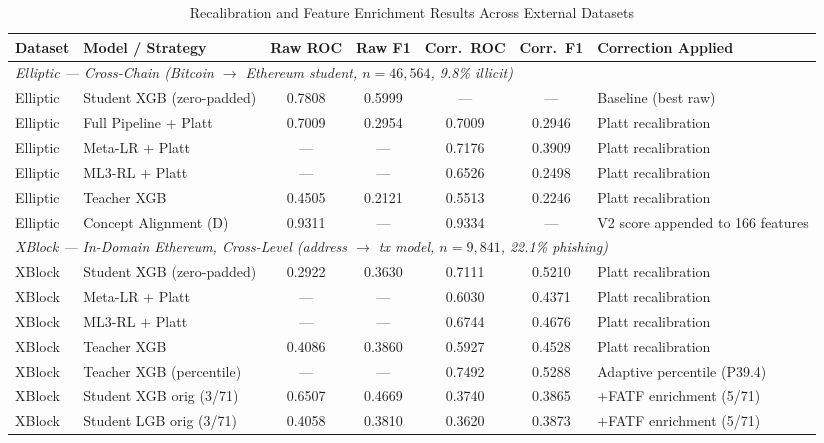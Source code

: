 \documentclass[journal]{IEEEtran}
\begin{document}
\begin{table}[!t]
\centering
\caption{Recalibration and Feature Enrichment Results Across External Datasets}
\label{tab:recalibration}
\scriptsize
\begin{tabular}{llccccl}
\toprule
\textbf{Dataset} & \textbf{Model / Strategy} & \textbf{Raw ROC} & \textbf{Raw F1} & \textbf{Corr.\ ROC} & \textbf{Corr.\ F1} & \textbf{Correction Applied} \\
\midrule
\multicolumn{7}{l}{\textit{Elliptic --- Cross-Chain (Bitcoin $\to$ Ethereum student, $n = 46{,}564$, 9.8\% illicit)}} \\
\cmidrule(l){1-7}
Elliptic & Student XGB (zero-padded) & 0.7808 & 0.5999 & --- & --- & Baseline (best raw) \\
Elliptic & Full Pipeline + Platt & 0.7009 & 0.2954 & 0.7009 & 0.2946 & Platt recalibration \\
Elliptic & Meta-LR + Platt & --- & --- & 0.7176 & 0.3909 & Platt recalibration \\
Elliptic & ML3-RL + Platt & --- & --- & 0.6526 & 0.2498 & Platt recalibration \\
Elliptic & Teacher XGB & 0.4505 & 0.2121 & 0.5513 & 0.2246 & Platt recalibration \\
Elliptic & Concept Alignment (D) & 0.9311 & --- & 0.9334 & --- & V2 score appended to 166 features \\
\midrule
\multicolumn{7}{l}{\textit{XBlock --- In-Domain Ethereum, Cross-Level (address $\to$ tx model, $n = 9{,}841$, 22.1\% phishing)}} \\
\cmidrule(l){1-7}
XBlock & Student XGB (zero-padded) & 0.2922 & 0.3630 & 0.7111 & 0.5210 & Platt recalibration \\
XBlock & Meta-LR + Platt & --- & --- & 0.6030 & 0.4371 & Platt recalibration \\
XBlock & ML3-RL + Platt & --- & --- & 0.6744 & 0.4676 & Platt recalibration \\
XBlock & Teacher XGB & 0.4086 & 0.3860 & 0.5927 & 0.4528 & Platt recalibration \\
XBlock & Teacher XGB (percentile) & --- & --- & 0.7492 & 0.5288 & Adaptive percentile (P39.4) \\
XBlock & Student XGB orig (3/71) & 0.6507 & 0.4669 & 0.3740 & 0.3865 & +FATF enrichment (5/71) \\
XBlock & Student LGB orig (3/71) & 0.4058 & 0.3810 & 0.3620 & 0.3873 & +FATF enrichment (5/71) \\

\end{tabular}
\end{table}
\end{document}
